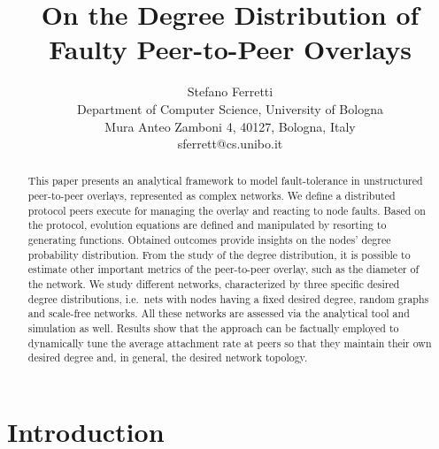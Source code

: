 \documentclass[a4paper,twosided]{article}
\begin{document}
\title{On the Degree Distribution of Faulty Peer-to-Peer Overlays}
\author{Stefano Ferretti\\
Department of Computer Science, University of Bologna\\ 
Mura Anteo Zamboni 4, 40127, Bologna, Italy\\
sferrett@cs.unibo.it}
\date{}
\maketitle












\begin{abstract}
This paper presents an analytical framework to model fault-tolerance in unstructured peer-to-peer overlays, represented as complex networks. We define a distributed protocol peers execute for managing the overlay and reacting to node faults. Based on the protocol, evolution equations are defined and manipulated by resorting to generating functions. Obtained outcomes provide insights on the nodes' degree probability distribution. 
From the study of the degree distribution, it is possible to estimate other important metrics of the peer-to-peer overlay, such as the diameter of the network.
We study different networks, characterized by three specific desired degree distributions, i.e.~nets with nodes having a fixed desired degree, random graphs and scale-free networks. All these networks are assessed via the analytical tool and simulation as well. Results show that the approach can be factually employed to dynamically tune the average attachment rate at peers so that they maintain their own desired degree and, in general, the desired network topology.
\end{abstract}






\section{Introduction}
\label{sec:intro}
\end{document}
